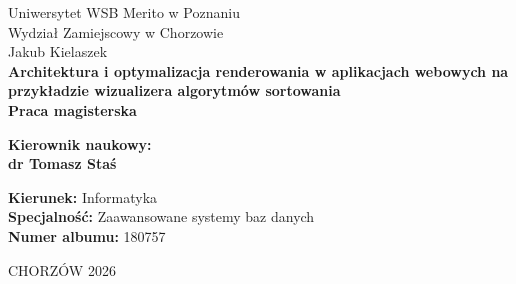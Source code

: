 \documentclass[12pt,openright,twoside]{report}
\begin{document}
\begin{titlepage}
    \begin{center}
        \fontsize{12}{14}\selectfont
        Uniwersytet WSB Merito w Poznaniu\\
        Wydział Zamiejscowy w Chorzowie \\

        \vspace{2cm}
        Jakub Kielaszek \\

        \vspace{2cm}
        \fontsize{16}{19}\selectfont
        \textbf{Architektura i optymalizacja renderowania w aplikacjach webowych na przykładzie wizualizera algorytmów sortowania}\\

        \vspace{2cm}
        \fontsize{12}{14}\selectfont
        \textbf{Praca magisterska}\\
    \end{center}

    \vspace{2cm}
    \begin{flushright}
        \fontsize{12}{14}\selectfont
        \textbf{Kierownik naukowy:}\\
        \textbf{dr Tomasz Staś}\\
    \end{flushright}

    \vspace{2cm}
    \begin{flushleft}
        \fontsize{16}{19}\selectfont
        \textbf{Kierunek:} Informatyka\\
        \textbf{Specjalność:} Zaawansowane systemy baz danych\\
        \textbf{Numer albumu:} 180757\\
    \end{flushleft}

    \vspace{1cm}
    \begin{center}
        \fontsize{12}{14}\selectfont
        CHORZÓW 2026
    \end{center}
\end{titlepage}

\tableofcontents
\end{document}
